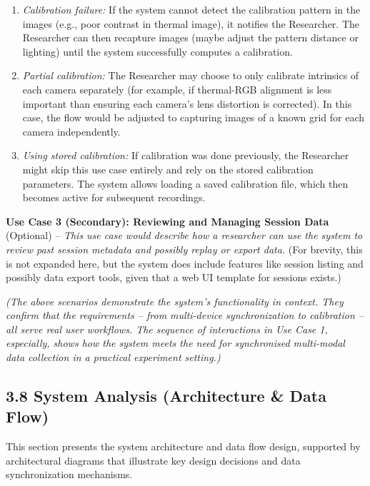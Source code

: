 \documentclass[12pt,a4paper]{article}
\begin{document}
\begin{itemize}
  \begin{enumerate}
  \def\labelenumi{\alph{enumi}.}
  \tightlist
  \item
    \emph{Calibration failure:} If the system cannot detect the calibration pattern in the images (e.g., poor contrast in thermal image), it notifies the Researcher. The Researcher can then recapture images (maybe adjust the pattern distance or lighting) until the system successfully computes a calibration.\\
  \item
    \emph{Partial calibration:} The Researcher may choose to only calibrate intrinsics of each camera separately (for example, if thermal-RGB alignment is less important than ensuring each camera's lens distortion is corrected). In this case, the flow would be adjusted to capturing images of a known grid for each camera independently.\\
  \item
    \emph{Using stored calibration:} If calibration was done previously, the Researcher might skip this use case entirely and rely on the stored calibration parameters. The system allows loading a saved calibration file, which then becomes active for subsequent recordings.
  \end{enumerate}
\end{itemize}

\textbf{Use Case 3 (Secondary): Reviewing and Managing Session Data} (Optional) -- \emph{This use case would describe how a researcher can use the system to review past session metadata and possibly replay or export data.} (For brevity, this is not expanded here, but the system does include features like session listing and possibly data export tools, given that a web UI template for sessions exists.)

\emph{(The above scenarios demonstrate the system's functionality in context. They confirm that the requirements -- from multi-device synchronization to calibration -- all serve real user workflows. The sequence of interactions in Use Case 1, especially, shows how the system meets the need for synchronised multi-modal data collection in a practical experiment setting.)}

\subsection{3.8 System Analysis (Architecture \& Data Flow)}\label{system-analysis-architecture-data-flow}

This section presents the system architecture and data flow design, supported by architectural diagrams that illustrate key design decisions and data synchronization mechanisms.
\end{document}
